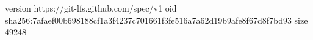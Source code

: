 version https://git-lfs.github.com/spec/v1
oid sha256:7afaef00b698188cf1a3f4237c701661f3fe516a7a62d19b9afe8f67d8f7bd93
size 49248
